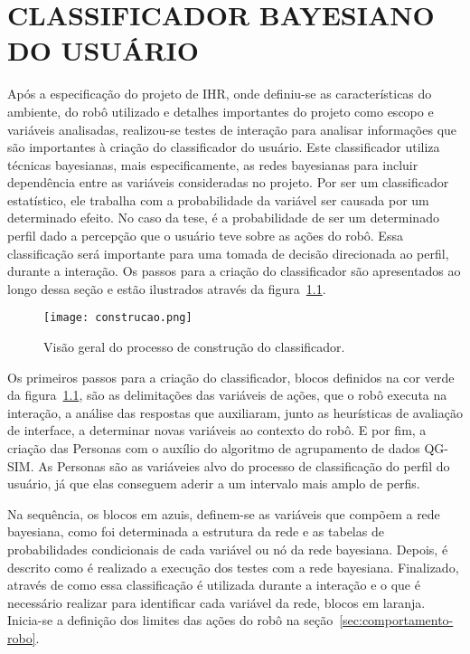\chapter{CLASSIFICADOR BAYESIANO DO USUÁRIO}
\label{cap:proposta}
Após a especificação do projeto de IHR, onde definiu-se as características do ambiente, do robô utilizado e detalhes importantes do projeto como escopo e variáveis analisadas, realizou-se testes de interação para analisar informações que são importantes à criação do classificador do usuário. Este classificador utiliza técnicas bayesianas, mais especificamente, as redes bayesianas para incluir dependência entre as variáveis consideradas no projeto. Por ser um classificador estatístico, ele trabalha com a probabilidade da variável ser causada por um determinado efeito. No caso da tese, é a probabilidade de ser um determinado perfil dado a percepção que o usuário teve sobre as ações do robô. Essa classificação será importante para uma tomada de decisão direcionada ao perfil, durante a interação. Os passos para a criação do classificador são apresentados ao longo dessa seção e estão ilustrados através da figura~\ref{fig:construcao}.

\begin{figure}[ht!]
	\centering
	\begin{minipage}{\textwidth}
		\caption{Visão geral do processo de construção do classificador.}
		\texttt{[image: construcao.png]}
		\label{fig:construcao}
	\end{minipage}
\end{figure}

Os primeiros passos para a criação do classificador, blocos definidos na cor verde da figura~\ref{fig:construcao}, são as delimitações das variáveis de ações, que o robô executa na interação, a análise das respostas que auxiliaram, junto as heurísticas de avaliação de interface, a determinar novas variáveis ao contexto do robô. E por fim, a criação das Personas com o auxílio do algoritmo de agrupamento de dados QG-SIM. As Personas são as variáveies alvo do processo de classificação do perfil do usuário, já que elas conseguem aderir a um intervalo mais amplo de perfis.

Na sequência, os blocos em azuis, definem-se as variáveis que compõem a rede bayesiana, como foi determinada a estrutura da rede e as tabelas de probabilidades condicionais de cada variável ou nó da rede bayesiana. Depois, é descrito como é realizado a execução dos testes com a rede bayesiana. Finalizado, através de como essa classificação é utilizada durante a interação e o que é necessário realizar para identificar cada variável da rede, blocos em laranja. Inicia-se a definição dos limites das ações do robô na seção~\ref{sec:comportamento-robo}.

